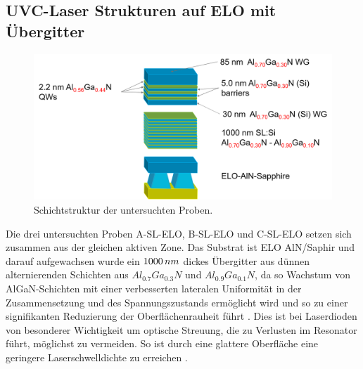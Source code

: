 \subsection{UVC-Laser Strukturen auf ELO mit Übergitter}
\begin{figure}[h]
\includegraphics[width=\linewidth]{Bilder/TS4048/ts4048.png}
\caption{Schichtstruktur der untersuchten Proben.}
\label{fig:schichtenelo}
\end{figure}
\noindent 
Die drei untersuchten Proben A-SL-ELO, B-SL-ELO und C-SL-ELO setzen sich zusammen aus der gleichen aktiven Zone. Das Substrat ist ELO AlN/Saphir und darauf aufgewachsen wurde ein $1000 \thinspace nm$ dickes Übergitter aus dünnen alternierenden Schichten aus $ Al_{0.7}Ga_{0.3}N$ und $ Al_{0.9}Ga_{0.1}N$, da so Wachstum von AlGaN-Schichten mit einer verbesserten lateralen Uniformität in der Zusammensetzung und des Spannungszustands ermöglicht wird und so zu einer signifikanten Reduzierung der Oberflächenrauheit führt \cite{doi:10.1002/pssa.201800005} \cite{tino}. Dies ist bei Laserdioden von besonderer Wichtigkeit um optische Streuung, die zu Verlusten im Resonator führt, möglichst zu vermeiden. So ist durch eine glattere Oberfläche eine geringere Laserschwelldichte zu erreichen \cite{doi:10.1002/pssa.201870032}.
%
